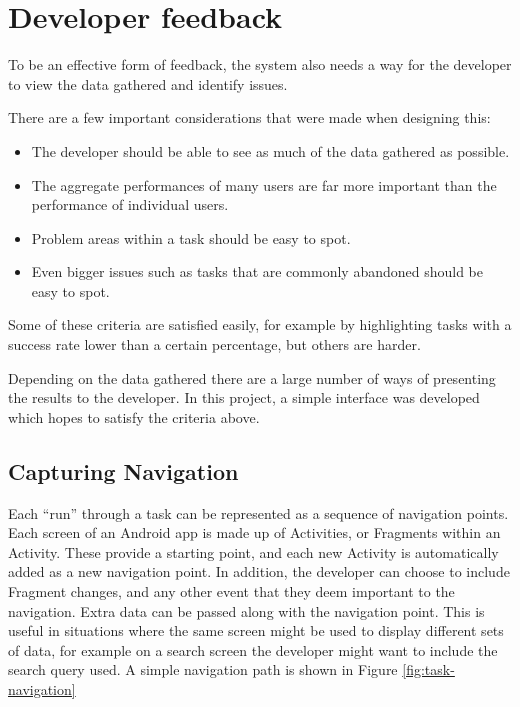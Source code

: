 \section{Developer feedback}
\label{sec:developer-feedback}

To be an effective form of feedback, the system also needs a way for the developer to view the data gathered and identify issues.

There are a few important considerations that were made when designing this:

\begin{itemize}
  \item The developer should be able to see as much of the data gathered as possible.
  \item The aggregate performances of many users are far more important than the performance of individual users.
  \item Problem areas within a task should be easy to spot.
  \item Even bigger issues such as tasks that are commonly abandoned should be easy to spot.
\end{itemize}

Some of these criteria are satisfied easily, for example by highlighting tasks with a success rate lower than a certain percentage, but others are harder.

Depending on the data gathered there are a large number of ways of presenting the results to the developer. In this project, a simple interface was developed which hopes to satisfy the criteria above.

\subsection{Capturing Navigation}

Each ``run'' through a task can be represented as a sequence of navigation points. Each screen of
an Android app is made up of Activities, or Fragments within an Activity. These provide a starting
point, and each new Activity is automatically added as a new navigation point. In addition, 
the developer can choose to include Fragment changes, and any other event that they deem important to 
the navigation. Extra data can be passed along with the navigation point. This is useful in situations
where the same screen might be used to display different sets of data, for example on a search screen the
developer might want to include the search query used. A simple navigation path is shown in Figure \ref{fig:task-navigation}

